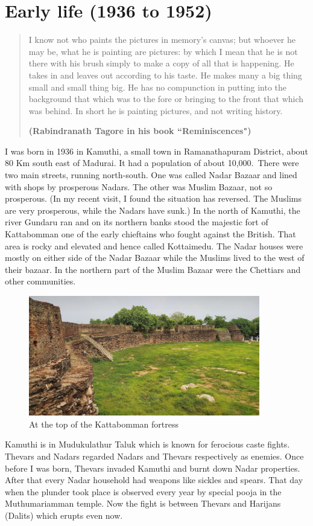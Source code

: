 \chapter{Early life (1936 to 1952)}

\begin{quote}
I know not who paints the pictures in memory's canvas; but whoever
he may be, what he is painting are pictures: by which I mean that 
he is not there with his brush simply to make a copy of all that is
happe\-ning. He takes in and leaves out according to his taste. He
makes many a big thing small and small thing big. He has no compunction 
in putting into the background that which was to the fore or bringing
to the front that which was behind. In short he is painting pictures, 
and not writing history.

\hfill {\small{\bf{(Rabindranath Tagore in his book ``Reminiscences")}}}
\end{quote}

I was born in 1936 in Kamuthi, a small town in Ramanatha\-puram District, 
about 80 Km south east of Madurai. It had a popula\-tion of about 10,000.\ 
There were two main streets, running north-south. One was called Nadar 
Bazaar and lined with shops by prosperous Nadars. The other was Muslim 
Bazaar, not so prosperous. (In my recent visit, I found the situation 
has reversed. The Muslims are very prosperous, while the Nadars have 
sunk.) In the north of Kamuthi, the river Gundaru ran and on its 
northern banks stood the majestic fort of Kattabomman one of the early 
chieftains who fought against the British. That area is rocky and 
elevated and hence called Kottaimedu. The Nadar houses were mostly on 
either side of the Nadar Bazaar while the Muslims lived to the west of 
their bazaar. In the northern part of the Muslim Bazaar were the 
Chettiars and other communities.


\begin{figure}[H]
\centering
\includegraphics[width=0.9\textwidth]{images/new-images/01-Rajaji-fort.jpg}
\caption{At the top of the Kattabomman fortress}
\end{figure}
\vspace{-\topsep}
Kamuthi is in Mudukulathur Taluk which is known for fero\-cious caste 
fights. Thevars and Nadars regarded Nadars and Thevars respectively as 
enemies. Once before I was born, Thevars invaded Kamuthi and burnt down 
Nadar properties. After that every Nadar household had weapons like 
sickles and spears. That day when the plunder took place is observed 
every year by special pooja in the Muthumariamman temple. Now the fight 
is bet\-ween Thevars and Harijans (Dalits) which erupts even now.

